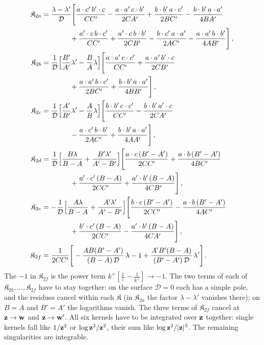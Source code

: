 \begin{align}\label{eq:app_K2}
\mathfrak K_{2a}&=\frac{\lambda-\lambda'}{\mathcal D}\Bigg[\frac{a\cdot c'\,b'\cdot c}{CC'}-\frac{a\cdot a'\,c\cdot b'}{2CA'}+\frac{b\cdot b'\,a\cdot c'}{2BC'}-\frac{b\cdot b'\,a\cdot a'}{4BA'}\notag\\&\qquad\qquad+\frac{a'\cdot c\,b\cdot c'}{CC'}+\frac{a'\cdot c\,b\cdot b'}{2CB'}-\frac{b\cdot c'\,a\cdot a'}{2AC'}-\frac{a\cdot a'\,b\cdot b'}{4AB'}\Bigg]\,,\notag\\
\mathfrak K_{2b}&=\frac{1}{\mathcal D}\Big[\frac{B'}{A'}\lambda'-\frac{B}{A}\lambda\Big]\Bigg[\frac{a\cdot a'\,c\cdot c'}{CC'}+\frac{a\cdot a'\,b'\cdot c}{2CB'}\notag\\&\qquad\qquad+\frac{a\cdot a'\,b\cdot c'}{2BC'}+\frac{b\cdot b'\,a\cdot a'}{4BB'}\Bigg]\,,\notag\\
\mathfrak K_{2c}&=\frac{1}{\mathcal D}\Big[\frac{A'}{B'}\lambda'-\frac{A}{B}\lambda\Big]\Bigg[\frac{b\cdot b'\,c\cdot c'}{CC'}-\frac{b\cdot b'\,a'\cdot c}{2CA'}\notag\\&\qquad\qquad-\frac{a\cdot c'\,b\cdot b'}{2AC'}+\frac{b\cdot b'\,a\cdot a'}{4AA'}\Bigg]\,,\notag\\
\mathfrak K_{2d}&=\frac{1}{\mathcal D}\Big[\frac{B\lambda}{B-A}+\frac{B'\lambda'}{A'-B'}\Big]\Bigg[\frac{a\cdot c\,(B'-A')}{2CC'}+\frac{a\cdot b\,(B'-A')}{4BC'}\notag\\&\qquad\qquad+\frac{a'\cdot c'\,(B-A)}{2CC'}+\frac{a'\cdot b'\,(B-A)}{4CB'}\Bigg]\,,\notag\\
\mathfrak K_{2e}&=-\frac{1}{\mathcal D}\Big[\frac{A\lambda}{B-A}+\frac{A'\lambda'}{A'-B'}\Big]\Bigg[\frac{b\cdot c\,(B'-A')}{2CC'}-\frac{a\cdot b\,(B'-A')}{4AC'}\notag\\&\qquad\qquad+\frac{b'\cdot c'\,(B-A)}{2CC'}-\frac{a'\cdot b'\,(B-A)}{4CA'}\Bigg]\,,\notag\\
\mathfrak K_{2f}&=\frac{1}{2CC'}\Bigg[-\frac{AB(B'-A')}{(B-A)\,\mathcal D}\,\lambda-1+\frac{A'B'(B-A)}{(B'-A')\,\mathcal D}\,\lambda'\Bigg]\,.
\end{align}
The $-1$ in $\mathfrak K_{2f}$ is the power term $k^+[\frac1\vee-\frac{1}{k^+}]\to-1$. The two terms of each of $\mathfrak K_{2b},\dots,\mathfrak K_{2f}$ have to stay together: on the surface $\mathcal D=0$ each has a simple pole, and the residues cancel within each $\mathfrak K$ (in $\mathfrak K_{2a}$ the factor $\lambda-\lambda'$ vanishes there); on $B=A$ and $B'=A'$ the logarithms vanish. The three terms of $\mathfrak K_{2f}$ cancel at $\mathbf{z}\to\mathbf{w}$ and $\mathbf{z}\to\mathbf{w}'$. All six kernels have to be integrated over $\mathbf{z}$ together: single kernels fall like $1/\mathbf{z}^2$ or $\log\mathbf{z}^2/\mathbf{z}^2$, their sum like $\log\mathbf{z}^2/|\mathbf{z}|^3$. The remaining singularities are integrable.

